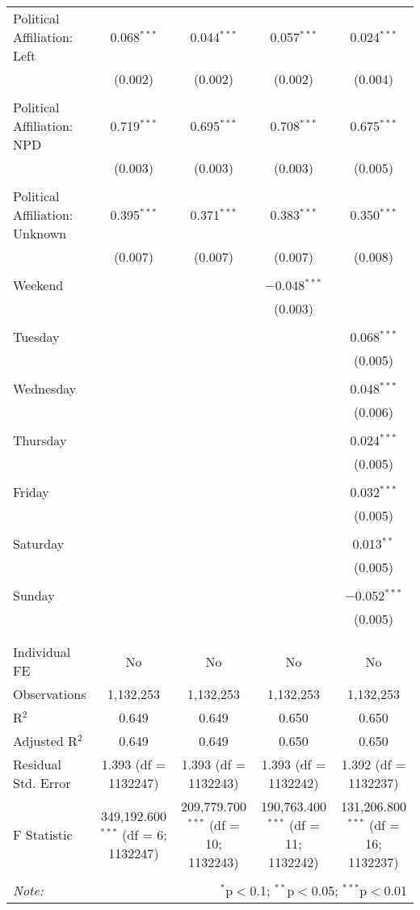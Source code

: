 \documentclass[
]{article}
\begin{document}
\begin{table}[!htbp]
{\begin{tabular}{@{\extracolsep{5pt}}lcccc}
 Political Affiliation: Left & 0.068$^{***}$ & 0.044$^{***}$ & 0.057$^{***}$ & 0.024$^{***}$ \\ 
  & (0.002) & (0.002) & (0.002) & (0.004) \\ 
  & & & & \\ 
 Political Affiliation: NPD & 0.719$^{***}$ & 0.695$^{***}$ & 0.708$^{***}$ & 0.675$^{***}$ \\ 
  & (0.003) & (0.003) & (0.003) & (0.005) \\ 
  & & & & \\ 
 Political Affiliation: Unknown & 0.395$^{***}$ & 0.371$^{***}$ & 0.383$^{***}$ & 0.350$^{***}$ \\ 
  & (0.007) & (0.007) & (0.007) & (0.008) \\ 
  & & & & \\ 
 Weekend &  &  & $-$0.048$^{***}$ &  \\ 
  &  &  & (0.003) &  \\ 
  & & & & \\ 
 Tuesday &  &  &  & 0.068$^{***}$ \\ 
  &  &  &  & (0.005) \\ 
  & & & & \\ 
 Wednesday &  &  &  & 0.048$^{***}$ \\ 
  &  &  &  & (0.006) \\ 
  & & & & \\ 
 Thursday &  &  &  & 0.024$^{***}$ \\ 
  &  &  &  & (0.005) \\ 
  & & & & \\ 
 Friday &  &  &  & 0.032$^{***}$ \\ 
  &  &  &  & (0.005) \\ 
  & & & & \\ 
 Saturday &  &  &  & 0.013$^{**}$ \\ 
  &  &  &  & (0.005) \\ 
  & & & & \\ 
 Sunday &  &  &  & $-$0.052$^{***}$ \\ 
  &  &  &  & (0.005) \\ 
  & & & & \\ 
\hline \\[-1.8ex] 
Individual FE & No & No & No & No \\ 
Observations & 1,132,253 & 1,132,253 & 1,132,253 & 1,132,253 \\ 
R$^{2}$ & 0.649 & 0.649 & 0.650 & 0.650 \\ 
Adjusted R$^{2}$ & 0.649 & 0.649 & 0.650 & 0.650 \\ 
Residual Std. Error & 1.393 (df = 1132247) & 1.393 (df = 1132243) & 1.393 (df = 1132242) & 1.392 (df = 1132237) \\ 
F Statistic & 349,192.600$^{***}$ (df = 6; 1132247) & 209,779.700$^{***}$ (df = 10; 1132243) & 190,763.400$^{***}$ (df = 11; 1132242) & 131,206.800$^{***}$ (df = 16; 1132237) \\ 
\hline 
\hline \\[-1.8ex] 
\textit{Note:}  & \multicolumn{4}{r}{$^{*}$p$<$0.1; $^{**}$p$<$0.05; $^{***}$p$<$0.01} \\ 
\end{tabular}
} 
\end{table} 
\newpage
\end{document}
